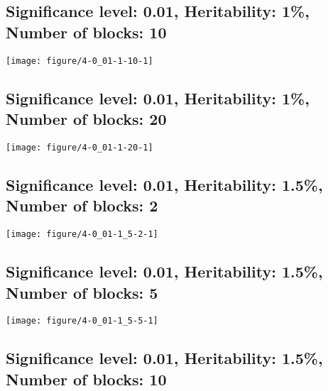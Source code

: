 \documentclass[11pt,letter]{article}\usepackage[]{graphicx}\usepackage[]{color}
\makeatletter
\def\maxwidth{ %
  \ifdim\Gin@nat@width>\linewidth
    \linewidth
  \else
    \Gin@nat@width
  \fi
}
\newenvironment{knitrout}{}{} %
\makeatother
\begin{document}
\newpage
\subsection{Significance level: 0.01, Heritability: 1\%, Number of blocks: 10}

\begin{knitrout}
\color{fgcolor}
\texttt{[image: figure/4-0\_01-1-10-1]} 

\end{knitrout}

\newpage
\subsection{Significance level: 0.01, Heritability: 1\%, Number of blocks: 20}

\begin{knitrout}
\color{fgcolor}
\texttt{[image: figure/4-0\_01-1-20-1]} 

\end{knitrout}

\newpage
\subsection{Significance level: 0.01, Heritability: 1.5\%, Number of blocks: 2}

\begin{knitrout}
\color{fgcolor}
\texttt{[image: figure/4-0\_01-1\_5-2-1]} 

\end{knitrout}

\newpage
\subsection{Significance level: 0.01, Heritability: 1.5\%, Number of blocks: 5}

\begin{knitrout}
\color{fgcolor}
\texttt{[image: figure/4-0\_01-1\_5-5-1]} 

\end{knitrout}

\newpage
\subsection{Significance level: 0.01, Heritability: 1.5\%, Number of blocks: 10}
\end{document}
